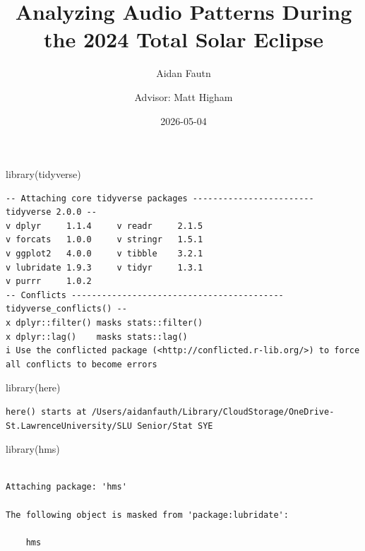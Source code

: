 \documentclass[
  letterpaper,
  DIV=11,
  numbers=noendperiod]{scrartcl}
\title{Analyzing Audio Patterns During the 2024 Total Solar Eclipse}
\author{Aidan Fautn \and Advisor: Matt Higham}
\date{2026-05-04}
\newenvironment{Shaded}{\begin{snugshade}}{\end{snugshade}}
\newcommand{\FunctionTok}[1]{\textcolor[rgb]{0.28,0.35,0.67}{#1}}
\newcommand{\NormalTok}[1]{\textcolor[rgb]{0.00,0.23,0.31}{#1}}
\renewcommand*\contentsname{Table of contents}
\newcommand\contentsname{Table of contents}
\begin{document}
\maketitle

\clearpage

\renewcommand*\contentsname{Table of contents}
{
\setcounter{tocdepth}{3}
\tableofcontents
}

\linespread{0.9}

\begin{Shaded}
\begin{Highlighting}[]
\FunctionTok{library}\NormalTok{(tidyverse)}
\end{Highlighting}
\end{Shaded}

\begin{verbatim}
-- Attaching core tidyverse packages ------------------------ tidyverse 2.0.0 --
v dplyr     1.1.4     v readr     2.1.5
v forcats   1.0.0     v stringr   1.5.1
v ggplot2   4.0.0     v tibble    3.2.1
v lubridate 1.9.3     v tidyr     1.3.1
v purrr     1.0.2     
-- Conflicts ------------------------------------------ tidyverse_conflicts() --
x dplyr::filter() masks stats::filter()
x dplyr::lag()    masks stats::lag()
i Use the conflicted package (<http://conflicted.r-lib.org/>) to force all conflicts to become errors
\end{verbatim}

\begin{Shaded}
\begin{Highlighting}[]
\FunctionTok{library}\NormalTok{(here)}
\end{Highlighting}
\end{Shaded}

\begin{verbatim}
here() starts at /Users/aidanfauth/Library/CloudStorage/OneDrive-St.LawrenceUniversity/SLU Senior/Stat SYE
\end{verbatim}

\begin{Shaded}
\begin{Highlighting}[]
\FunctionTok{library}\NormalTok{(hms)}
\end{Highlighting}
\end{Shaded}

\begin{verbatim}

Attaching package: 'hms'

The following object is masked from 'package:lubridate':

    hms
\end{verbatim}
\end{document}
